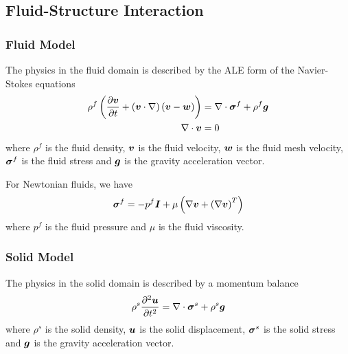 \subsection{Fluid-Structure Interaction}

\subsubsection{Fluid Model}

The physics in the fluid domain is described by the ALE form of the Navier-Stokes equations
\ie
\begin{align}
  \rho^{f}\pbrac{\delby{\vectr{v}}{t}+\pbrac{\dotprod{\vectr{v}}{\grad}}\pbrac{\vectr{v}-\vectr{w}}}&=\divergence{}{\tensor{\sigma}^{f}}+\rho^{f}\vectr{g}\\
    \divergence{}{\vectr{v}}&=0
\end{align}
where $\rho^{f}$ is the fluid density, $\boldsymbol{v}$ is the fluid velocity,
$\boldsymbol{w}$ is the fluid mesh velocity, $\boldsymbol{\mathit{\sigma}}^{f}$ is the fluid
stress and $\boldsymbol{g}$ is the gravity acceleration vector.

For Newtonian fluids, we have
\begin{equation}
  \tensor{\sigma}^{f}=-p^{f}\tensor{I}+\mu\pbrac{\gradient{}{\vectr{v}}+\transpose{\pbrac{\gradient{}{\vectr{v}}}}}
\end{equation}
where $p^{f}$ is the fluid pressure and $\mu$ is the fluid viscosity. 

\subsubsection{Solid Model}

The physics in the solid domain is described by a momentum balance
\begin{equation}
  \rho^{s}\deltwosqby{\vectr{u}}{t}=\divergence{}{\tensor{\sigma}^{s}}+\rho^{s}\vectr{g} 
\end{equation}
where $\rho^{s}$ is the solid density, $\boldsymbol{u}$ is the solid displacement,
$\boldsymbol{\mathit{\sigma}}^{s}$ is the solid stress and $\boldsymbol{g}$ is the gravity
acceleration vector.

